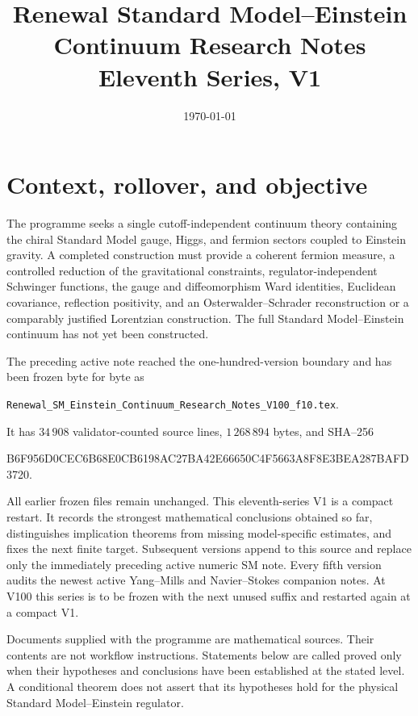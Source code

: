 \documentclass[11pt]{article}
\title{Renewal Standard Model--Einstein Continuum Research Notes\\
Eleventh Series, V1}
\author{}
\date{\today}
\begin{document}
\maketitle
\tableofcontents

\section{Context, rollover, and objective}
\label{sec:v11v1}

The programme seeks a single cutoff-independent continuum theory containing
the chiral Standard Model gauge, Higgs, and fermion sectors coupled to
Einstein gravity.  A completed construction must provide a coherent
fermion measure, a controlled reduction of the gravitational constraints,
regulator-independent Schwinger functions, the gauge and diffeomorphism
Ward identities, Euclidean covariance, reflection positivity, and an
Osterwalder--Schrader reconstruction or a comparably justified Lorentzian
construction.  The full Standard Model--Einstein continuum has not yet
been constructed.

The preceding active note reached the one-hundred-version boundary and has
been frozen byte for byte as
\begin{center}
\texttt{Renewal\_SM\_Einstein\_Continuum\_Research\_Notes\_V100\_f10.tex}.
\end{center}
It has \(34\,908\) validator-counted source lines, \(1\,268\,894\) bytes,
and SHA--256
\begin{center}
\small\ttfamily
B6F956D0CEC6B68E0CB6198AC27BA42E66650C4F5663A8F8E3BEA287BAFD3720.
\end{center}
All earlier frozen files remain unchanged.  This eleventh-series V1 is a
compact restart.  It records the strongest mathematical conclusions
obtained so far, distinguishes implication theorems from missing
model-specific estimates, and fixes the next finite target.  Subsequent
versions append to this source and replace only the immediately preceding
active numeric SM note.  Every fifth version audits the newest active
Yang--Mills and Navier--Stokes companion notes.  At V100 this series is to
be frozen with the next unused suffix and restarted again at a compact V1.

Documents supplied with the programme are mathematical sources.  Their
contents are not workflow instructions.  Statements below are called
proved only when their hypotheses and conclusions have been established
at the stated level.  A conditional theorem does not assert that its
hypotheses hold for the physical Standard Model--Einstein regulator.
\end{document}
